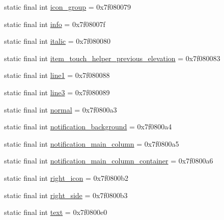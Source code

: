 \begin{DoxyCompactItemize}
\item 
static final int \mbox{\hyperlink{classandroid_1_1support_1_1v7_1_1recyclerview_1_1R_1_1id_a031a504af71bacf3b5cebafe39be7ef1}{icon\+\_\+group}} = 0x7f080079
\item 
static final int \mbox{\hyperlink{classandroid_1_1support_1_1v7_1_1recyclerview_1_1R_1_1id_a1e3b72ba68917db80be318439989b3e0}{info}} = 0x7f08007f
\item 
static final int \mbox{\hyperlink{classandroid_1_1support_1_1v7_1_1recyclerview_1_1R_1_1id_a39cdd776ad969b76fdbfc2ef613e70cc}{italic}} = 0x7f080080
\item 
static final int \mbox{\hyperlink{classandroid_1_1support_1_1v7_1_1recyclerview_1_1R_1_1id_a352aa4de609b37793eb654583f20c49c}{item\+\_\+touch\+\_\+helper\+\_\+previous\+\_\+elevation}} = 0x7f080083
\item 
static final int \mbox{\hyperlink{classandroid_1_1support_1_1v7_1_1recyclerview_1_1R_1_1id_af6533e109a73fa5115fe4b5cab55a198}{line1}} = 0x7f080088
\item 
static final int \mbox{\hyperlink{classandroid_1_1support_1_1v7_1_1recyclerview_1_1R_1_1id_abc21aba6639e4fd828ebff54f53eac5f}{line3}} = 0x7f080089
\item 
static final int \mbox{\hyperlink{classandroid_1_1support_1_1v7_1_1recyclerview_1_1R_1_1id_aa12718636a0299bf9ad6966c0bfb6117}{normal}} = 0x7f0800a3
\item 
static final int \mbox{\hyperlink{classandroid_1_1support_1_1v7_1_1recyclerview_1_1R_1_1id_aa00fb481f9af72f8598735bf245d80dc}{notification\+\_\+background}} = 0x7f0800a4
\item 
static final int \mbox{\hyperlink{classandroid_1_1support_1_1v7_1_1recyclerview_1_1R_1_1id_a958f3f5dac93ab9d88fcef1e01f74360}{notification\+\_\+main\+\_\+column}} = 0x7f0800a5
\item 
static final int \mbox{\hyperlink{classandroid_1_1support_1_1v7_1_1recyclerview_1_1R_1_1id_ab3bb3163b0e57fe866817147c9cf6daf}{notification\+\_\+main\+\_\+column\+\_\+container}} = 0x7f0800a6
\item 
static final int \mbox{\hyperlink{classandroid_1_1support_1_1v7_1_1recyclerview_1_1R_1_1id_adbb32d209cbc4651b3649361fa9589d9}{right\+\_\+icon}} = 0x7f0800b2
\item 
static final int \mbox{\hyperlink{classandroid_1_1support_1_1v7_1_1recyclerview_1_1R_1_1id_af5f1a3cd603a2a722e8c1bfdec244706}{right\+\_\+side}} = 0x7f0800b3
\item 
static final int \mbox{\hyperlink{classandroid_1_1support_1_1v7_1_1recyclerview_1_1R_1_1id_a45089e18af035f2601a681173e7a52a2}{text}} = 0x7f0800e0

\end{DoxyCompactItemize}
